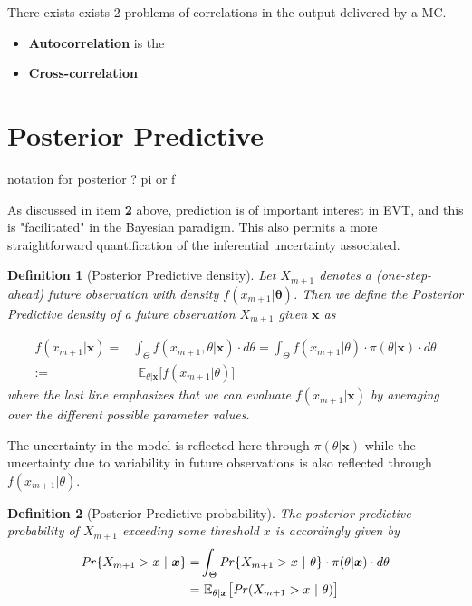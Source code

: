 \documentclass[11pt,a4paper,openany ]{book}
\newtheorem{definition}{Definition}[chapter]
\begin{document}
There exists exists 2 problems of correlations in the output delivered by a MC. 

\begin{itemize}
	\item \textbf{Autocorrelation} is the
	\item \textbf{Cross-correlation}
\end{itemize}


\section{Posterior Predictive}
notation for posterior ? pi or f


As discussed in \hyperref[it2bayes]{item \textbf{2}} above, prediction is of important interest in EVT, and this is "facilitated" in the Bayesian paradigm. This also permits a more straightforward quantification of the inferential uncertainty associated.

\begin{definition}[Posterior Predictive density]
	Let $X_{m+1}$ denotes a (one-step-ahead) future observation with density $f(x_{m+1}|\boldsymbol{\theta})$. Then we define the Posterior Predictive density of a future observation $X_{m+1}$ given $\boldsymbol{x}$ as 
	
	\begin{equation}
	\begin{aligned}
	f(x_{m+1}|\boldsymbol{x})
	= & \int_{\Theta}f(x_{m+1},\theta | \boldsymbol{x})\cdot d\theta=\int_{\Theta} f(x_{m+1}|\theta)\cdot \pi (\theta|\boldsymbol{x})\cdot d\theta
	\\ := & \ \ \mathbb{E}_{\theta|\boldsymbol{x}}\big[f(x_{m+1}|\theta)\big]
	\end{aligned}
	\end{equation}
	where the last line emphasizes that we can evaluate $f(x_{m+1}|\boldsymbol{x})$ by averaging over the different possible parameter values.
	
\end{definition}

The uncertainty in the model is reflected here through $\pi(\theta|\boldsymbol{x})$ while the uncertainty due to variability in future observations is also reflected through $f(x_{m+1}|\theta)$.

\begin{definition}[Posterior Predictive probability]
	The posterior predictive probability of $X_{m+1}$ exceeding some threshold $x$ is accordingly given by
	\begin{equation}
	\begin{aligned}
	\text{\emph{Pr}}\{X_{m+1}>x\ | \ \boldsymbol{x}\}= &\int_{\Theta}\text{\emph{Pr}}\{X_{m+1}>x \ | \ \theta \} \cdot \pi(\theta|\boldsymbol{x})\cdot d\theta \\ 
	= & \ \mathbb{E}_{\theta|\boldsymbol{x}}\big[\text{\emph{Pr}}(X_{m+1}>x \ | \ \theta)\big]
	\end{aligned}
	\end{equation}
\end{definition}
\end{document}
